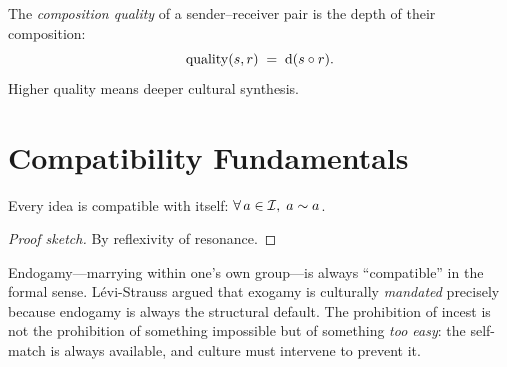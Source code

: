 \begin{definition}
\label{def:comp-quality}
The \emph{composition quality} of a sender--receiver pair is the depth of
their composition:
\[
  \operatorname{quality}(s, r) \;=\; \operatorname{d}(s \circ r).
\]
Higher quality means deeper cultural synthesis.
\end{definition}

\section{Compatibility Fundamentals}
\label{sec:ch12-compat}

\begin{theorem}
\label{thm:self-compat}
Every idea is compatible with itself: $\forall\, a \in \mathcal{I},\; a \sim a$.
\end{theorem}

\begin{proof}[Proof sketch]
By reflexivity of resonance.
\end{proof}

Endogamy---marrying within one's own group---is always ``compatible'' in the
formal sense.  Lévi-Strauss argued that exogamy is culturally
\emph{mandated} precisely because endogamy is always the structural default.
The prohibition of incest is not the prohibition of something impossible but
of something \emph{too easy}: the self-match is always available, and culture
must intervene to prevent it.


